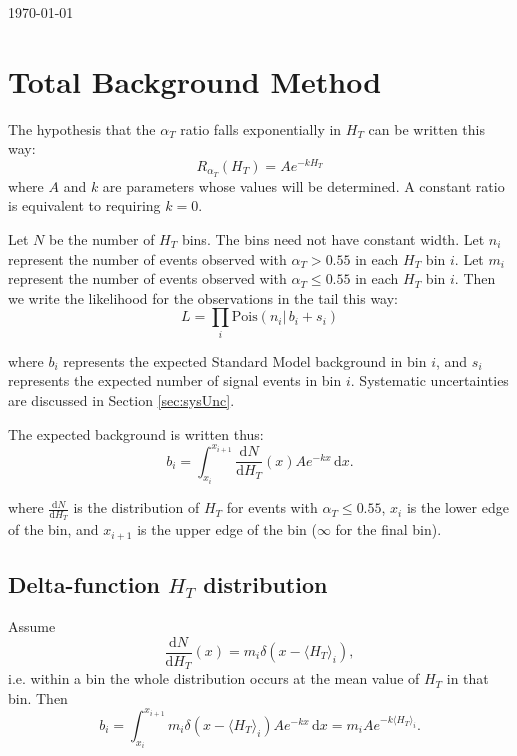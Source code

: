 \documentclass[12pt]{article}
\begin{document}
\today

\section{Total Background Method}
The hypothesis that the $\alpha_{T}$ ratio falls exponentially in $H_T$ can be written this way:
\begin{equation}
R_{\alpha_{T}}(H_T) = A e^{-k H_T}
\end{equation}
where $A$ and $k$ are parameters whose values will be determined.  A constant ratio is equivalent to requiring $k=0$.

Let $N$ be the number of $H_T$ bins.  The bins need not have constant width.
Let $n_i$ represent the number of events observed with $\alpha_{T} > 0.55$ in each $H_T$ bin $i$.
Let $m_i$ represent the number of events observed with $\alpha_{T} \le 0.55$ in each $H_T$ bin $i$.
Then we write the likelihood for the observations in the tail this way:
\begin{equation}
L=\prod_i \mathrm{Pois}(n_i |\, b_i + s_i)
\end{equation}

where $b_i$ represents the expected Standard Model background in bin $i$, 
and $s_i$ represents the expected number of signal events in bin $i$.
Systematic uncertainties are discussed in Section \ref{sec:sysUnc}.

The expected background is written thus:
\begin{equation}
b_i = \int_{x_i}^{x_{i+1}}\! \frac{\mathrm{d}N}{\mathrm{d}H_T}(x) A e^{-k x}\, \mathrm{d}x.
\end{equation}

where $\frac{\mathrm{d}N}{\mathrm{d}H_T}$ is the distribution of $H_T$ for events with $\alpha_{T} \le 0.55$,
$x_i$ is the lower edge of the bin, and $x_{i+1}$ is the upper edge of the bin ($\infty$ for the final bin).

\subsection{Delta-function $H_T$ distribution}
\label{sec:diracDeltaHt}
Assume
\begin{equation}
\frac{\mathrm{d}N}{\mathrm{d}H_T}(x) = m_{i}\delta(x-\langle H_T \rangle_i),
\end{equation}
i.e. within a bin the whole distribution occurs at the mean value of $H_T$ in that bin.
Then
\begin{equation}
b_i = \int_{x_i}^{x_{i+1}}\! m_{i}\delta(x-\langle H_T \rangle_i) Ae^{-kx}\, \mathrm{d}x = m_{i} Ae^{-k \langle H_T \rangle_i}.
\label{eq:biDirac}
\end{equation}
\end{document}
